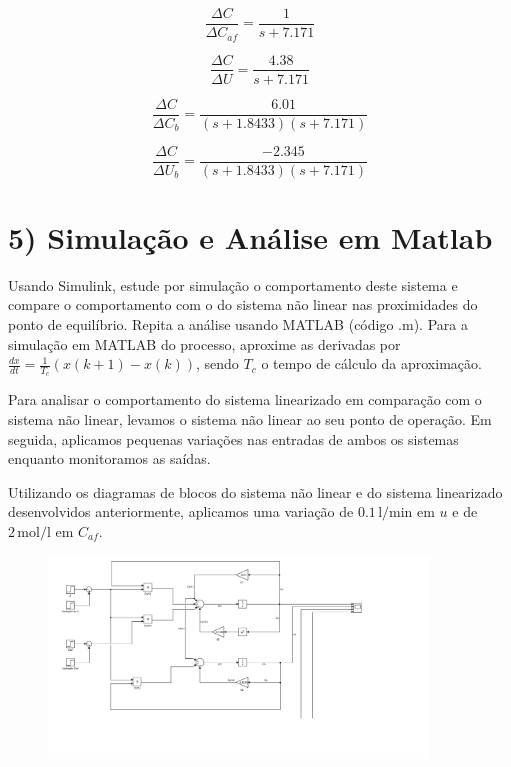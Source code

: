 \documentclass[a4paper,12pt]{report}
\begin{document}
\[
\frac{\Delta C}{\Delta C_{af}} = \frac{1}{s + 7.171}
\]

\[
\frac{\Delta C}{\Delta U} = \frac{4.38}{s + 7.171}
\]

\[
\frac{\Delta C}{\Delta C_b} = \frac{6.01}{(s + 1.8433)(s + 7.171)}
\]

\[
\frac{\Delta C}{\Delta U_b} = \frac{-2.345}{(s + 1.8433)(s + 7.171)}
\]

\newpage

\section{5) Simulação e Análise em Matlab}

Usando Simulink, estude por simulação o comportamento deste sistema e compare o comportamento com o do sistema não linear nas proximidades do ponto de equilíbrio. Repita a análise usando MATLAB (código .m). Para a simulação em MATLAB do processo, aproxime as derivadas por \( \frac{dx}{dt} = \frac{1}{T_c}(x(k+1) - x(k)) \), sendo \( T_c \) o tempo de cálculo da aproximação.


Para analisar o comportamento do sistema linearizado em comparação com o sistema não linear, levamos o sistema não linear ao seu ponto de operação. Em seguida, aplicamos pequenas variações nas entradas de ambos os sistemas enquanto monitoramos as saídas.

Utilizando os diagramas de blocos do sistema não linear e do sistema linearizado desenvolvidos anteriormente, aplicamos uma variação de \(0.1 \, \text{l/min}\) em \(u\) e de \(2 \, \text{mol/l}\) em \(C_{af}\).

\begin{figure}[h]
    \centering
    \includegraphics[width=0.9\textwidth]{figura8_1.png}
\end{figure}
\end{document}
